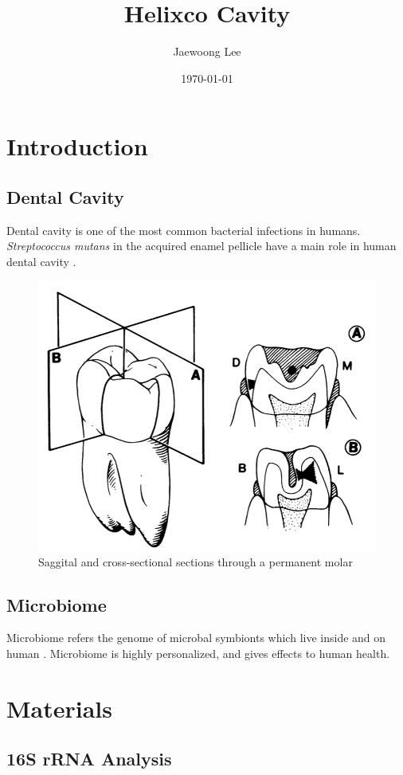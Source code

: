 \documentclass[11pt, a4paper]{article}
\title{Helixco Cavity}
\author{Jaewoong Lee}
\date{\today}
\begin{document}
    \maketitle
    \newpage

    \tableofcontents
    \listoftables
    \listoffigures
    \newpage

    \section{Introduction}
        \subsection{Dental Cavity}
            Dental cavity is one of the most common bacterial infections in humans. \textit{Streptococcus mutans} in the acquired enamel pellicle have a main role in human dental cavity \cite{cavity1, cavity2}.

            \begin{figure}[htbp]
                \centering
                \includegraphics[width=0.4 \linewidth]{figures/molar.png}
                \caption{Saggital and cross-sectional sections through a permanent molar \protect \cite{cavity1}}
                \label{fig:molar}
            \end{figure}

        \subsection{Microbiome}
            Microbiome refers the genome of microbal symbionts which live inside and on human \cite{microbiome1}. Microbiome is highly personalized, and gives effects to human health.

    \section{Materials}
        \subsection{16S rRNA Analysis}
\end{document}

